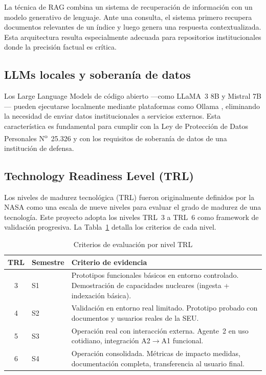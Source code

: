 \documentclass[a4paper, 12pt]{article}
\begin{document}
La t\'ecnica de RAG \parencite{lewis2020} combina un sistema de recuperaci\'on de informaci\'on con un modelo generativo de lenguaje. Ante una consulta, el sistema primero recupera documentos relevantes de un \'indice y luego genera una respuesta contextualizada. Esta arquitectura resulta especialmente adecuada para repositorios institucionales donde la precisi\'on factual es cr\'itica.

\subsection{LLMs locales y soberan\'ia de datos}

Los Large Language Models de c\'odigo abierto ---como LLaMA~3 8B y Mistral 7B--- pueden ejecutarse localmente mediante plataformas como Ollama \parencite{ollama2024}, eliminando la necesidad de enviar datos institucionales a servicios externos. Esta caracter\'istica es fundamental para cumplir con la Ley de Protecci\'on de Datos Personales N\textsuperscript{o}~25.326 \parencite{ley25326} y con los requisitos de soberan\'ia de datos de una instituci\'on de defensa.

\subsection{Technology Readiness Level (TRL)}

Los niveles de madurez tecnol\'ogica (\ac{TRL}) fueron originalmente definidos por la NASA \parencite{mankins1995} como una escala de nueve niveles para evaluar el grado de madurez de una tecnolog\'ia. Este proyecto adopta los niveles TRL~3 a TRL~6 como framework de validaci\'on progresiva. La Tabla~\ref{tab:trl-criterios} detalla los criterios de cada nivel.

\begin{table}[htbp]
  \centering
  \caption{Criterios de evaluaci\'on por nivel TRL}
  \label{tab:trl-criterios}
  \begin{tabularx}{\textwidth}{clX}
    \toprule
    \textbf{TRL} & \textbf{Semestre} & \textbf{Criterio de evidencia} \\
    \midrule
    3 & S1 & Prototipos funcionales b\'asicos en entorno controlado. Demostraci\'on de capacidades nucleares (ingesta + indexaci\'on b\'asica). \\
    4 & S2 & Validaci\'on en entorno real limitado. Prototipo probado con documentos y usuarios reales de la \ac{SEU}. \\
    5 & S3 & Operaci\'on real con interacci\'on externa. Agente~2 en uso cotidiano, integraci\'on A2$\rightarrow$A1 funcional. \\
    6 & S4 & Operaci\'on consolidada. M\'etricas de impacto medidas, documentaci\'on completa, transferencia al usuario final. \\
    \bottomrule
  \end{tabularx}
\end{table}
\end{document}

